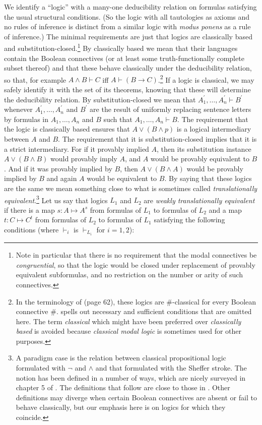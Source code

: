 We identify a ``logic'' with a many-one deducibility relation on formulas satisfying the usual structural conditions. (So the logic with all tautologies as axioms and no rules of inference is distinct from a similar logic with \textit{modus ponens} as a rule of inference.) The minimal requirements are just that logics are classically based and substitution-closed.\footnote{Note in particular that there is no requirement that the modal connectives be \textit{congruential}, so that the logic would be closed under replacement of provably equivalent subformulas, and no restriction on the number or arity of such connectives.} By classically based we mean that their languages contain the Boolean connectives (or at least some truth-functionally complete subset thereof) and that these behave classically under the deducibility relation, so that, for example $A \wedge B \vdash C$ iff $A \vdash (B \rightarrow C)$.\footnote{In the terminology of \citet{Humberstone.2011} (page 62), these logics are $\#$-classical for every Boolean connective $\#$. \citet{Humberstone.2011} spells out necessary and sufficient conditions that are omitted here. The term \textit{classical} which might have been preferred over \textit{classically based} is avoided because \textit{classical modal logic} is sometimes used for other purposes.} If a logic is classical, we may safely identify it with the set of its theorems, knowing that these will determine the deducibility relation. By substitution-closed we mean that $A_1^\prime,{\ldots},A_n^\prime \vdash B^\prime$ whenever $A_1^\prime,{\ldots},A_n^\prime$ and $B^\prime$ are the result of uniformly replacing sentence letters by formulas in $A_1,{\ldots},A_n$ and $B$ such that $A_1,{\ldots},A_n \vdash B$. The requirement that the logic is classically based ensures that $A\vee (B\wedge p)$ is a logical intermediary between $A$ and $B$. The requirement that it is substitution-closed implies that it is a strict intermediary. For if it provably implied $A$, then its substitution instance $A\vee (B\wedge B)$ would provably imply $A$, and $A$ would be provably equivalent to $B$. And if it was provably implied by $B$, then $A\vee (B\wedge A)$ would be provably implied by $B$ and again $A$ would be equivalent to $B$. By saying that these logics are the same we mean something close to what is sometimes called \textit{translationally equivalent}.\footnote{A paradigm case is the relation between classical propositional logic formulated with $\neg$ and $\wedge$ and that formulated with the Sheffer stroke. The notion has been defined in a number of ways, which are nicely surveyed in chapter 5 of \citet{French2010}. The definitions that follow are close to those in \citet{Kuhn.1978}. Other definitions may diverge when certain Boolean connectives are absent or fail to behave classically, but our emphasis here is on logics for which they coincide.} Let us say that logics $L_1$ and $L_2$ are \textit{weakly translationally equivalent} if there is a map $s\colon A{\mapsto}A^s$ from formulas of $L_1$ to formulas of $L_2$ and a map $t\colon C{\mapsto}C^t$ from formulas of $L_2$ to formulas of $L_1$ satisfying the following conditions (where $\vdash_i$ is $\vdash_{L_i}$ for $i=1,2$):
